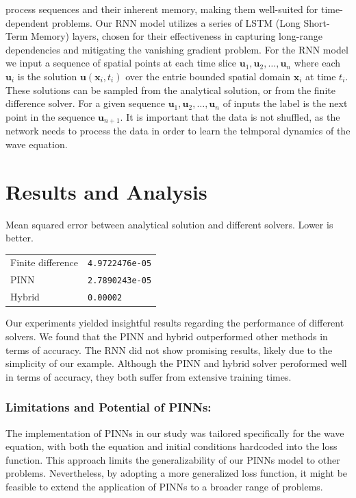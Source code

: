 \documentclass[twoside,11pt]{report}
\begin{document}
    process sequences and their inherent memory, making them well-suited for time-dependent problems.
    Our RNN model utilizes a series of LSTM (Long Short-Term Memory)\cite{lstm} layers, chosen for their 
    effectiveness in capturing long-range dependencies and mitigating the vanishing gradient problem.
    For the RNN model we input a sequence of spatial points at each time slice 
    $\mathbf{u}_1, \mathbf{u}_2, \dots, \mathbf{u}_n$ where each $\mathbf{u}_i$ is 
    the solution $\mathbf{u}(\mathbf{x}_i,t_i)$
    over the entrie bounded spatial domain $\mathbf{x}_i$ at time $t_i$. These solutions can be sampled from the analytical
    solution, or from the finite difference solver.
    For a given sequence $\mathbf{u}_1, \mathbf{u}_2, \dots, \mathbf{u}_n$ of inputs the 
    label is the next point in the sequence
    $\mathbf{u}_{n+1}$.
    It is important that the data is not shuffled, as the network needs to process the data in order to learn the
    telmporal dynamics of the wave equation.
        \cite{hu2022neuralpde}



\section{Results and Analysis}
\label{sec:resultsdiscussion}

    \begin{mytable}[float=!h,label=tab:toyscores, width=0.5\textwidth]{Mean squared error between 
        analytical solution and different solvers. Lower is better.}
    \centering
    \begin{tabular}{l|l}
        Finite difference   &\texttt{4.9722476e-05}  \\
        PINN                &\texttt{2.7890243e-05}  \\
        Hybrid              &\texttt{0.00002}  \\
    \end{tabular}%
    \end{mytable}
    
    Our experiments yielded insightful results regarding the performance of different solvers. 
    We found that the PINN and hybrid outperformed other methods in terms of accuracy. The RNN did 
    not show promising results, likely due to the simplicity of our example.
    Although the PINN and hybrid solver peroformed well in terms of accuracy, they both suffer from extensive
    training times.
    \subsubsection{Limitations and Potential of PINNs:}
    The implementation of PINNs in our study was tailored specifically for the wave equation, with both the 
    equation and initial conditions hardcoded into the loss function. This approach limits the generalizability 
    of our PINNs model to other problems. Nevertheless, by adopting a more generalized loss function, it might 
    be feasible to extend the application of PINNs to a broader range of problems.
\end{document}
